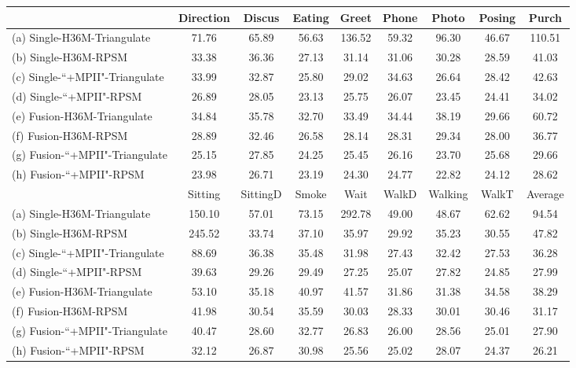 \documentclass[10pt,twocolumn,letterpaper]{article}
\begin{document}
\begin{table*}[]
\center
\caption{$3$D pose estimation errors MPJPE ($mm$) of different methods on the H36M dataset. The naming convention of the methods follows the rule of ``A-B-C'' where ``A'' indicates whether we use fusion in $2$D pose estimation. ``Single'' means the cross view fusion is not used. ``B'' denotes the training datasets. ``H36M'' means we only use the H36M dataset and ``+MPII'' means we combine H36M with MPII for training. ``C'' represents the method for estimating $3$D poses.}
\label{table:baselines3d}
\begin{tabular}{l c c c c c c c c}
\toprule
& Direction & Discus & Eating & Greet & Phone & Photo & Posing & Purch \\
\toprule
(a) Single-H36M-Triangulate & 71.76 & 65.89 & 56.63 & 136.52 & 59.32 & 96.30 & 46.67 & 110.51\\
(b) Single-H36M-RPSM & 33.38 & 36.36 & 27.13 & 31.14 & 31.06 & 30.28 & 28.59 & 41.03\\
(c) Single-``+MPII"-Triangulate & 33.99 & 32.87 & 25.80 & 29.02 & 34.63 & 26.64 & 28.42 & 42.63\\
(d) Single-``+MPII"-RPSM & 26.89 & 28.05 & 23.13 & 25.75 & 26.07 & 23.45 & 24.41 & 34.02\\
(e) Fusion-H36M-Triangulate & 34.84 & 35.78 & 32.70 & 33.49 & 34.44 & 38.19 & 29.66 & 60.72\\ 
(f) Fusion-H36M-RPSM & 28.89 & 32.46 & 26.58 & 28.14 & 28.31 & 29.34 & 28.00 & 36.77\\ 
(g) Fusion-``+MPII"-Triangulate & 25.15 & 27.85 & 24.25 & 25.45 & 26.16 & 23.70 & 25.68 & 29.66\\
(h) Fusion-``+MPII"-RPSM & 23.98 & 26.71 & 23.19 & 24.30 & 24.77 & 22.82 & 24.12 & 28.62\\

\toprule
& Sitting & SittingD & Smoke & Wait & WalkD & Walking & WalkT & Average \\
\toprule
(a) Single-H36M-Triangulate  & 150.10 & 57.01 & 73.15 & 292.78 & 49.00 & 48.67 & 62.62 & 94.54\\
(b) Single-H36M-RPSM  & 245.52 & 33.74 & 37.10 & 35.97 & 29.92 & 35.23 & 30.55 & 47.82\\
(c) Single-``+MPII"-Triangulate & 88.69 & 36.38 & 35.48 & 31.98 & 27.43 & 32.42 & 27.53 & 36.28\\ 
(d) Single-``+MPII"-RPSM & 39.63 & 29.26 & 29.49 & 27.25 & 25.07 & 27.82 & 24.85 & 27.99\\
(e) Fusion-H36M-Triangulate & 53.10 & 35.18 & 40.97 & 41.57 & 31.86 & 31.38 & 34.58 & 38.29\\ 
(f) Fusion-H36M-RPSM & 41.98 & 30.54 & 35.59 & 30.03 & 28.33 & 30.01 & 30.46 & 31.17\\ 
(g) Fusion-``+MPII"-Triangulate & 40.47 & 28.60 & 32.77 & 26.83 & 26.00 & 28.56 & 25.01& 27.90\\
(h) Fusion-``+MPII"-RPSM  & 32.12 & 26.87 & 30.98 & 25.56 & 25.02 & 28.07 & 24.37 & 26.21 \\
\toprule
\end{tabular}

\end{table*}
\end{document}
